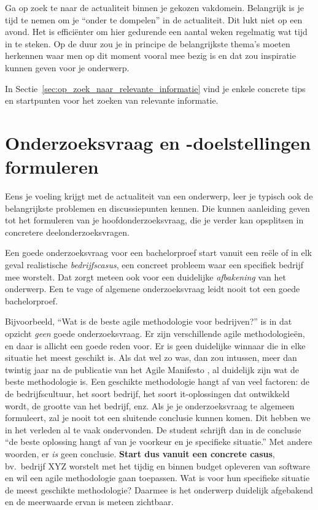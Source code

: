 Ga op zoek te naar de actualiteit binnen je gekozen vakdomein. Belangrijk is je tijd te nemen om je ``onder te dompelen'' in de actualiteit. Dit lukt niet op een avond. Het is efficiënter om hier gedurende een aantal weken regelmatig wat tijd in te steken. Op de duur zou je in principe de belangrijkste thema's moeten herkennen waar men op dit moment vooral mee bezig is en dat zou inspiratie kunnen geven voor je onderwerp.

In Sectie~\ref{sec:op_zoek_naar_relevante_informatie} vind je enkele concrete tips en startpunten voor het zoeken van relevante informatie.

\section{Onderzoeksvraag en -doelstellingen formuleren}%
\label{sec:onderzoeksvraag_formuleren}

Eens je voeling krijgt met de actualiteit van een onderwerp, leer je typisch ook de belangrijkste problemen en discussiepunten kennen. Die kunnen aanleiding geven tot het formuleren van je hoofdonderzoeksvraag, die je verder kan opsplitsen in concretere deelonderzoeksvragen.

Een goede onderzoeksvraag voor een bachelorproef start vanuit een reële of in elk geval realistische \textit{bedrijfscasus}, een concreet probleem waar een specifiek bedrijf mee worstelt. Dat zorgt meteen ook voor een duidelijke \textit{afbakening} van het onderwerp. Een te vage of algemene onderzoeksvraag leidt nooit tot een goede bachelorproef.

Bijvoorbeeld, ``Wat is de beste agile methodologie voor bedrijven?'' is in dat opzicht \textit{geen} goede onderzoeksvraag. Er zijn verschillende agile methodologieën, en daar is allicht een goede reden voor. Er is geen duidelijke winnaar die in elke situatie het meest geschikt is. Als dat wel zo was, dan zou intussen, meer dan twintig jaar na de publicatie van het Agile Manifesto \autocite{BeckEtAl2001}, al duidelijk zijn wat de beste methodologie is. Een geschikte methodologie hangt af van veel factoren: de de bedrijfscultuur, het soort bedrijf, het soort it-oplossingen dat ontwikkeld wordt, de grootte van het bedrijf, enz. Als je je onderzoeksvraag te algemeen formuleert, zal je nooit tot een sluitende conclusie kunnen komen. Dit hebben we in het verleden al te vaak ondervonden. De student schrijft dan in de conclusie ``de beste oplossing hangt af van je voorkeur en je specifieke situatie.'' Met andere woorden, er \textit{is} geen conclusie. \textbf{Start dus vanuit een concrete casus}, bv.\ bedrijf XYZ worstelt met het tijdig en binnen budget opleveren van software en wil een agile methodologie gaan toepassen. Wat is voor hun specifieke situatie de meest geschikte methodologie? Daarmee is het onderwerp duidelijk afgebakend en de meerwaarde ervan is meteen zichtbaar.

